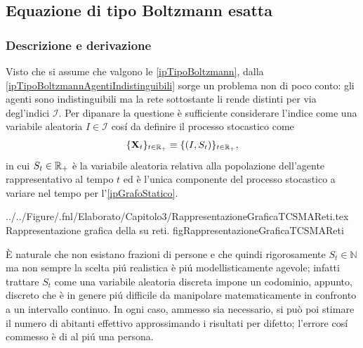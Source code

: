     \subsection{Equazione di tipo Boltzmann esatta}\label{secTipoBoltzmannUrbano}
      
      \subsubsection{Descrizione e derivazione}

        Visto che si assume che valgono le \cref{ipTipoBoltzmann}\footnotemark{}, dalla \ref{ipTipoBoltzmannAgentiIndistinguibili} sorge un problema non di poco conto: gli agenti sono indistinguibili ma la rete sottostante li rende distinti per via degl'indici \(\mathcal I\). Per dipanare la questione è sufficiente considerare l'indice come una variabile aleatoria \(I\in\mathcal I\) cosí da definire il processo stocastico come%
        \begin{equation*}
          \{\mathbf X_t\}_{t\in\mathbb R_+}\equiv\{(I,S_t)\}_{t\in\mathbb R_+},
        \end{equation*}
        in cui \(S_t\in\mathbb R_+\) è la variabile aleatoria relativa alla popolazione dell'agente rappresentativo al tempo \(t\) ed è l'unica componente del processo stocastico a variare nel tempo per l'\cref{ipGrafoStatico}.

          {../../Figure/.fnl/Elaborato/Capitolo3/RappresentazioneGraficaTCSMAReti.tex}
          {Rappresentazione grafica della \protect\TCSMA{} su reti.}
          {\linewidth}{figRappresentazioneGraficaTCSMAReti}

        \begin{oss}
          \label{ossNaturaNumericaPopolazione}
          È naturale che non esistano frazioni di persone e che quindi rigorosamente \(S_t\in\mathbb N\) ma non sempre la scelta piú realistica è piú modellisticamente agevole; infatti trattare \(S_t\) come una variabile aleatoria discreta impone un codominio, appunto, discreto che è in genere piú difficile da manipolare matematicamente in confronto a un intervallo continuo. In ogni caso, ammesso sia necessario, si può poi stimare il numero di abitanti effettivo approssimando i risultati per difetto; l'errore cosí commesso è di al piú una persona.
        \end{oss}

